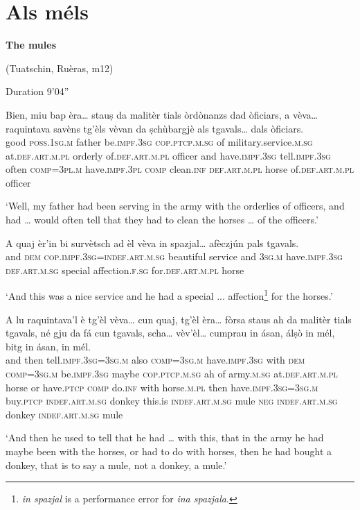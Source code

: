 \section{Als méls}
\textbf{The mules}


(Tuatschin, Ruèras, m12)


Duration 9'04''
\bigskip

\begin{linenumbers}
\gll  Bien, miu bap èra… stauṣ da malitèr tials òrdònanzs dad òficiars, a vèva… raquintava savèns tg’èls vèvan da ṣchùbargjè als tgavals… dals òficiars.  \\
good \textsc{poss.1sg.m} father be.\textsc{impf.3sg} \textsc{cop.ptcp.m.sg} of military.service.\textsc{m.sg}  at.\textsc{def.art.m.pl} orderly of.\textsc{def.art.m.pl} officer and have.\textsc{impf.3sg}  tell.\textsc{impf.3sg} often \textsc{comp=3pl.m} have.\textsc{impf.3pl} \textsc{comp}  clean.\textsc{inf} \textsc{def.art.m.pl} horse of.\textsc{def.art.m.pl}  officer \\
\end{linenumbers}
\medskip
\glt `Well, my father had been serving in the army with the orderlies of officers, and had … would often tell that they had to clean the horses … of the officers.'
\medskip

\begin{linenumbers}
\gll  A quaj èr’in bi survètsch ad èl vèva in spazjal… afèczjún pals tgavals.  \\
and \textsc{dem} \textsc{cop.impf.3sg=indef.art.m.sg} beautiful service and \textsc{3sg.m}  have.\textsc{impf.3sg} \textsc{def.art.m.sg} special affection.\textsc{f.sg} for.\textsc{def.art.m.pl} horse\\
\end{linenumbers}
\medskip
\glt `And this was a nice service and he had a special ... affection\footnote{\textit{in spazjal} is a performance error for \textit{ina spazjala}.} for the horses.'
\medskip

\begin{linenumbers}
\gll A lu raquintava’l è tg’èl vèva… cun quaj, tg'èl èra… fòrsa staus ah da malitèr tials tgavals, né gju da fá cun tgavals, scha… vèv’èl… cumprau in ásan, álṣò in mél, bitg in ásan, in mél.   \\
and then tell.\textsc{impf.3sg=3sg.m} also \textsc{comp=3sg.m} have.\textsc{impf.3sg} with \textsc{dem} \textsc{comp=3sg.m} be.\textsc{impf.3sg} maybe \textsc{cop.ptcp.m.sg} ah  of army.\textsc{m.sg} at.\textsc{def.art.m.pl} horse or have.\textsc{ptcp}  \textsc{comp} do.\textsc{inf} with horse.\textsc{m.pl} then have.\textsc{impf.3sg=3sg.m}  buy.\textsc{ptcp}  \textsc{indef.art.m.sg} donkey this.is \textsc{indef.art.m.sg} mule \textsc{neg}  \textsc{indef.art.m.sg} donkey \textsc{indef.art.m.sg} mule \\
\end{linenumbers}
\medskip
\glt `And then he used to tell that he had … with this, that in the army he had maybe been with the horses, or had to do with horses, then he had bought a donkey, that is to say a mule, not a donkey, a mule.'
\medskip

